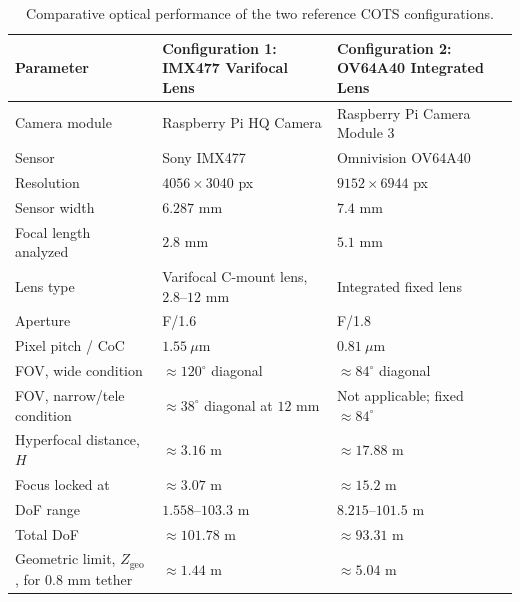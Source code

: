 \begin{table}[!ht]
\centering
\small
\caption{Comparative optical performance of the two reference COTS configurations.}
\label{tab:optical-configurations}
\begin{tabularx}{\textwidth}{p{} X X}
\toprule
\textbf{Parameter} & 
\textbf{Configuration 1: IMX477 Varifocal Lens} & 
\textbf{Configuration 2: OV64A40 Integrated Lens} \\
\midrule

Camera module & Raspberry Pi HQ Camera & Raspberry Pi Camera Module 3 \\

Sensor & Sony IMX477 & Omnivision OV64A40 \\

Resolution & $4056 \times 3040$ px & $9152 \times 6944$ px \\

Sensor width & $6.287$ mm & $7.4$ mm \\

Focal length analyzed & $2.8$ mm & $5.1$ mm \\

Lens type & Varifocal C-mount lens, $2.8$--$12$ mm & Integrated fixed lens \\

Aperture & F/1.6 & F/1.8 \\

Pixel pitch / CoC & $1.55~\mu$m & $0.81~\mu$m \\

FOV, wide condition & $\approx 120^\circ$ diagonal & $\approx 84^\circ$ diagonal \\

FOV, narrow/tele condition & $\approx 38^\circ$ diagonal at $12$ mm & Not applicable; fixed $\approx 84^\circ$ \\

Hyperfocal distance, $H$ & $\approx 3.16$ m & $\approx 17.88$ m \\

Focus locked at & $\approx 3.07$ m & $\approx 15.2$ m \\

DoF range & $1.558$--$103.3$ m & $8.215$--$101.5$ m \\

Total DoF & $\approx 101.78$ m & $\approx 93.31$ m \\

Geometric limit, $Z_{\mathrm{geo}}$, for $0.8$ mm tether & $\approx 1.44$ m & $\approx 5.04$ m \\


\end{tabularx}
\end{table}

